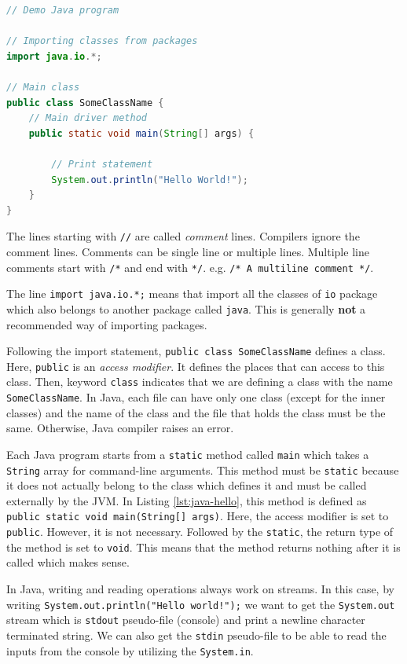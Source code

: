 \begin{lstlisting}[language=java,caption={Hello world example written in Java.},label=lst:java-hello]
// Demo Java program

// Importing classes from packages
import java.io.*;

// Main class
public class SomeClassName {
    // Main driver method
    public static void main(String[] args) {

        // Print statement
        System.out.println("Hello World!");
    }
}
\end{lstlisting}

The lines starting with \lstinline!//! are called \emph{comment} lines. Compilers ignore the comment lines. Comments can be single line or multiple lines. Multiple line comments start with \verb|/*| and end with \verb|*/|. e.g. \verb|/* A multiline comment */|.

The line \lstinline!import java.io.*;! means that import all the classes of \lstinline!io! package which also belongs to another package called \lstinline!java!. This is generally \textbf{not} a recommended way of importing packages.

Following the import statement, \lstinline!public class SomeClassName! defines a class. Here, \lstinline!public! is an \emph{access modifier}. It defines the places that can access to this class. Then, keyword \lstinline!class! indicates that we are defining a class with the name \lstinline!SomeClassName!. In Java, each file can have only one class (except for the inner classes) and the name of the class and the file that holds the class must be the same. Otherwise, Java compiler raises an error.

Each Java program starts from a \lstinline!static! method called \lstinline|main| which takes a \lstinline|String| array for command-line arguments. This method must be \lstinline|static| because it does not actually belong to the class which defines it and must be called externally by the JVM. In Listing \ref{lst:java-hello}, this method is defined as \lstinline!public static void main(String[] args)!. Here, the access modifier is set to \lstinline|public|. However, it is not necessary. Followed by the \lstinline|static|, the return type of the method is set to \lstinline|void|. This means that the method returns nothing after it is called which makes sense.

In Java, writing and reading operations always work on streams. In this case, by writing \lstinline{System.out.println("Hello world!");} we want to get the \lstinline|System.out| stream which is \lstinline|stdout| pseudo-file (console) and print a newline character terminated string. We can also get the \lstinline|stdin| pseudo-file to be able to read the inputs from the console by utilizing the \lstinline|System.in|.

